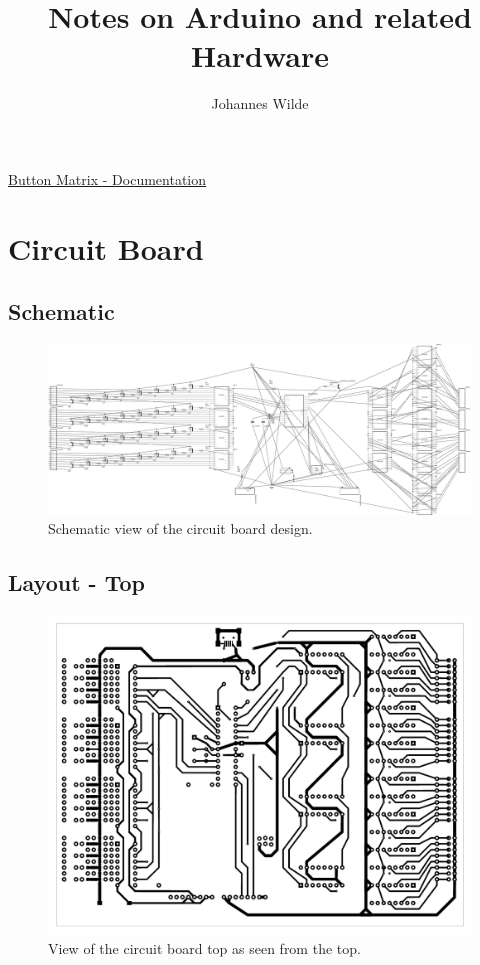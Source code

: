 \documentclass[english, parskip=half-, 11pt]{scrartcl}
\title{Notes on Arduino and related Hardware}
\author{Johannes Wilde}
\begin{document}
\begin{center}
	\Huge \underline{Button Matrix - Documentation}
\end{center}

\section{Circuit Board}

\subsection{Schematic}

\begin{figure}[H]
	\centering
	\includegraphics[width=\textwidth]{./Images/201902_GameBoard_schem-v1.pdf}
	\caption{Schematic view of the circuit board design.}
	\label{fig:schematic}
\end{figure}
%


\subsection{Layout - Top}

\begin{figure}[H]
	\centering
	\includegraphics[width=.7\textwidth]{./Images/201902_GameBoard_fudged_final1_etch_copper_top.pdf}
	\caption{View of the circuit board top as seen from the top.}
	\label{fig:circuitTop}
\end{figure}
\end{document}
